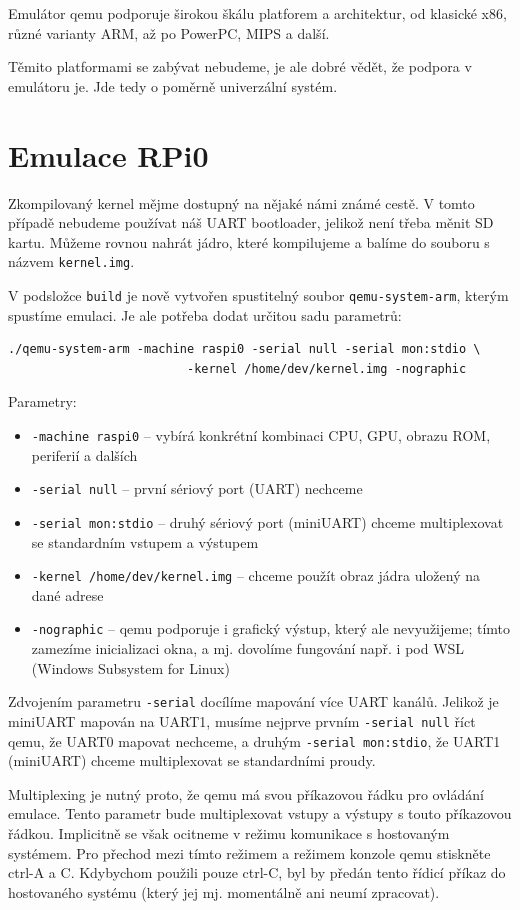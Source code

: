 \documentclass{article}
\begin{document}
Emulátor qemu podporuje širokou škálu platforem a architektur, od klasické x86, různé varianty ARM, až po PowerPC, MIPS a další.

Těmito platformami se zabývat nebudeme, je ale dobré vědět, že podpora v emulátoru je. Jde tedy o poměrně univerzální systém.

\section{Emulace RPi0}

Zkompilovaný kernel mějme dostupný na nějaké námi známé cestě. V tomto případě nebudeme používat náš UART bootloader, jelikož není třeba měnit SD kartu. Můžeme rovnou nahrát jádro, které kompilujeme a balíme do souboru s názvem {\tt kernel.img}.

V podsložce {\tt build} je nově vytvořen spustitelný soubor {\tt qemu-system-arm}, kterým spustíme emulaci. Je ale potřeba dodat určitou sadu parametrů:

\begin{verbatim}
./qemu-system-arm -machine raspi0 -serial null -serial mon:stdio \
                         -kernel /home/dev/kernel.img -nographic
\end{verbatim}

Parametry:
\begin{itemize}
	\item {\tt -machine raspi0} -- vybírá konkrétní kombinaci CPU, GPU, obrazu ROM, periferií a dalších
	\item {\tt -serial null} -- první sériový port (UART) nechceme
	\item {\tt -serial mon:stdio} -- druhý sériový port (miniUART) chceme multiplexovat se standardním vstupem a výstupem
	\item {\tt -kernel /home/dev/kernel.img} -- chceme použít obraz jádra uložený na dané adrese
	\item {\tt -nographic} -- qemu podporuje i grafický výstup, který ale nevyužijeme; tímto zamezíme inicializaci okna, a mj. dovolíme fungování např. i pod WSL (Windows Subsystem for Linux)
\end{itemize}

Zdvojením parametru {\tt -serial} docílíme mapování více UART kanálů. Jelikož je miniUART mapován na UART1, musíme nejprve prvním {\tt -serial null} říct qemu, že UART0 mapovat nechceme, a druhým {\tt -serial mon:stdio}, že UART1 (miniUART) chceme multiplexovat se standardními proudy.

Multiplexing je nutný proto, že qemu má svou příkazovou řádku pro ovládání emulace. Tento parametr bude multiplexovat vstupy a výstupy s touto příkazovou řádkou. Implicitně se však ocitneme v režimu komunikace s hostovaným systémem. Pro přechod mezi tímto režimem a režimem konzole qemu stiskněte ctrl-A a C. Kdybychom použili pouze ctrl-C, byl by předán tento řídicí příkaz do hostovaného systému (který jej mj. momentálně ani neumí zpracovat).
\end{document}

